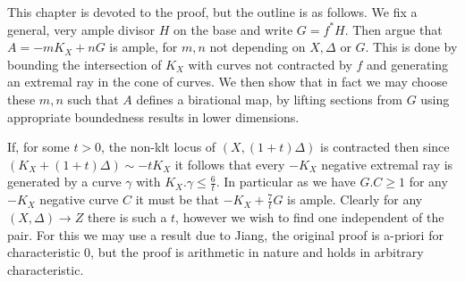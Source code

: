 This chapter is devoted to the proof, but the outline is as follows. We fix a general, very ample divisor $H$ on the base and write $G=f^{*}H$. Then argue that $A=-mK_{X}+nG$ is ample, for $m,n$ not depending on $X,\Delta$ or $G$. This is done by bounding the intersection of $K_{X}$ with curves not contracted by $f$ and generating an extremal ray in the cone of curves. We then show that in fact we may choose these $m,n$ such that $A$ defines a birational map, by lifting sections from $G$ using appropriate boundedness results in lower dimensions. 

If, for some $t>0$, the non-klt locus of $(X,(1+t)\Delta)$ is contracted then since $(K_{X}+(1+t)\Delta) \sim -tK_{X}$ it follows that every $-K_{X}$ negative extremal ray is generated by a curve $\gamma$ with $K_{X}.\gamma \leq \frac{6}{t}$. In particular as we have $G.C \geq 1$ for any $-K_{X}$ negative curve $C$ it must be that $-K_{X}+\frac{7}{t}G$ is ample. Clearly for any $(X,\Delta) \to Z$ there is such a $t$, however we wish to find one independent of the pair. For this we may use a result due to Jiang, the original proof is a-priori for characteristic $0$, but the proof is arithmetic in nature and holds in arbitrary characteristic.

